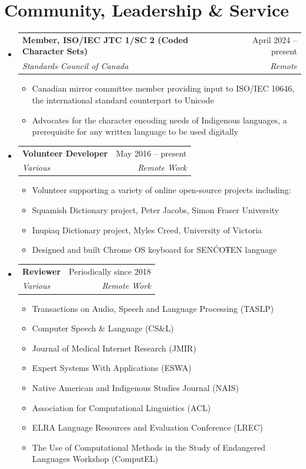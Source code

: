 \documentclass[letterpaper,11pt]{article}
\makeatletter
\newcommand{\resumeItem}[1]{
  \item\small{
    {#1 \vspace{-2pt}}
  }
}
\newcommand{\resumeSubheading}[4]{
  \vspace{-2pt}\item
    \begin{tabular*}{0.97\textwidth}[t]{l@{\extracolsep{\fill}}r}
      \textbf{#1} & #2 \\
      \textit{\small#3} & \textit{\small #4} \\
    \end{tabular*}\vspace{-7pt}
}
\newcommand{\resumeSubHeadingListStart}{\begin{itemize}[leftmargin=0.15in, label={}]}
\newcommand{\resumeSubHeadingListEnd}{\end{itemize}}
\newcommand{\resumeItemListStart}{\begin{itemize}}
\newcommand{\resumeItemListEnd}{\end{itemize}\vspace{-5pt}}
\makeatother
\begin{document}
\section{Community, Leadership \& Service}
  \resumeSubHeadingListStart
    \resumeSubheading
      {Member, ISO/IEC JTC 1/SC 2 (Coded Character Sets)}{April 2024 – present}
      {Standards Council of Canada}{Remote}
      \resumeItemListStart
        \resumeItem{Canadian mirror committee member providing input to ISO/IEC 10646, the international standard counterpart to Unicode}
        \resumeItem{Advocates for the character encoding needs of Indigenous languages, a prerequisite for any written language to be used digitally}
      \resumeItemListEnd
    \resumeSubheading
      {Volunteer Developer}{May 2016 – present}
      {Various}{Remote Work}
      \resumeItemListStart
        \resumeItem{Volunteer supporting a variety of online open-source projects including:}
        \resumeItem{Squamish Dictionary project, Peter Jacobs, Simon Fraser University}
        \resumeItem{Inupiaq Dictionary project, Myles Creed, University of Victoria}
        \resumeItem{Designed and built Chrome OS keyboard for SENĆOŦEN language}
      \resumeItemListEnd
    \resumeSubheading
      {Reviewer}{Periodically since 2018}
      {Various}{Remote Work}
      \resumeItemListStart
        \resumeItem{Transactions on Audio, Speech and Language Processing (TASLP)}
        \resumeItem{Computer Speech \& Language (CS\&L)}
        \resumeItem{Journal of Medical Internet Research (JMIR)}
        \resumeItem{Expert Systems With Applications (ESWA)}
        \resumeItem{Native American and Indigenous Studies Journal (NAIS)}
        \resumeItem{Association for Computational Linguistics (ACL)}
        \resumeItem{ELRA Language Resources and Evaluation Conference (LREC)}
        \resumeItem{The Use of Computational Methods in the Study of Endangered Languages Workshop (ComputEL)}
      \resumeItemListEnd
  \resumeSubHeadingListEnd

\end{document}
